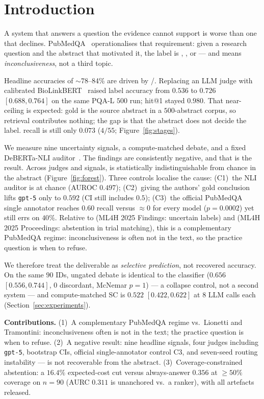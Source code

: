 \section{Introduction}
\label{sec:intro}

A system that answers a question the evidence cannot support is worse
than one that declines. PubMedQA~\citep{jin2019pubmedqa} operationalises
that requirement: given a research question and the abstract that
motivated it, the label is \yes{}, \no{}, or \maybe{} --- and \maybe{}
means \emph{inconclusiveness}, not a third topic.

Headline accuracies of $\sim$78--84\% are driven by \yes{}/\no{}.
Replacing an LLM judge with calibrated
BioLinkBERT~\citep{yasunaga2022linkbert} raised label accuracy from
$0.536$ to $0.726$ $[0.688,0.764]$ on the same PQA-L $500$ run; hit@1
stayed $0.980$. That near-ceiling is expected: gold is the source
abstract in a $500$-abstract corpus, so retrieval contributes nothing;
the gap is that the abstract does not decide the label. \maybe{} recall
is still only $0.073$ ($4/55$; Figure~\ref{fig:stages}).

We measure nine uncertainty signals, a compute-matched debate, and a
fixed DeBERTa-NLI auditor~\citep{abdaljalil2026knowing}. The findings
are consistently negative, and that is the result. Across judges and
signals, \maybe{} is statistically indistinguishable from chance in the
abstract (Figure~\ref{fig:forest}). Three controls localise the cause:
(C1)~the NLI auditor is at chance (AUROC $0.497$); (C2)~giving the
authors' gold conclusion lifts \texttt{gpt-5} only to $0.592$ (CI still
includes $0.5$); (C3)~the official PubMedQA single annotator reaches
$0.60$ \maybe{} recall versus $\approx 0$ for every model ($p{=}0.0002$)
yet still errs on $40\%$. Relative to \citet{lionetti2025clinical}
(ML4H 2025 Findings: uncertain labels) and \citet{tramontini2026rag}
(ML4H 2025 Proceedings: abstention in trial matching), this is a
complementary PubMedQA regime: inconclusiveness is often not in the
text, so the practice question is when to refuse.

We therefore treat the deliverable as \emph{selective prediction}, not
recovered \maybe{} accuracy. On the same $90$ IDs, ungated debate is
identical to the classifier ($0.656$ $[0.556,0.744]$, $0$ discordant,
McNemar $p{=}1$) --- a collapse control, not a second system --- and
compute-matched SC is $0.522$ $[0.422,0.622]$ at $8$ LLM calls each
(Section~\ref{sec:experiments}).

\noindent\textbf{Contributions.}
(1)~A complementary PubMedQA regime vs.\ Lionetti and Tramontini:
inconclusiveness often is not in the text; the practice question is
when to refuse.
(2)~A negative result: nine headline signals, four judges including
\texttt{gpt-5}, bootstrap CIs, official single-annotator control C3, and
seven-seed routing instability --- \maybe{} is not recoverable from the
abstract.
(3)~Coverage-constrained abstention: a $16.4\%$ expected-cost cut
versus always-answer $0.356$ at $\ge 50\%$ coverage on $n{=}90$ (AURC
$0.311$ is unanchored vs.\ a ranker), with all artefacts released.
